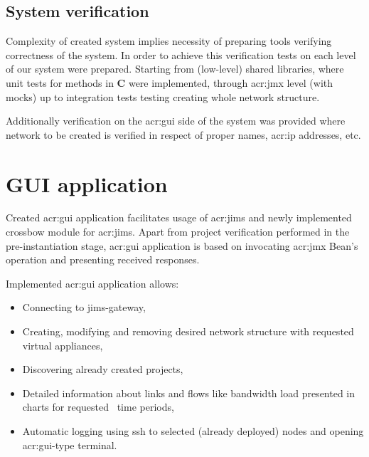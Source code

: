 \documentclass[11pt]{book}
\begin{document}
		\subsection{System verification}
			\label{sec:impl:verif}
		
      Complexity of created system implies necessity of preparing tools verifying correctness of the system. In order to
      achieve this verification tests on each level of our system were prepared. Starting from (low-level) shared
      libraries, where unit tests for methods in \textbf{C} were implemented, through \gls{acr:jmx} level (with mocks)
      up to integration tests testing creating whole network structure.
		
      Additionally verification on the \gls{acr:gui} side of the system was provided where network to be created is
      verified in respect of proper names, \gls{acr:ip} addresses, etc.

	\section{GUI application}
		\label{sec:impl:gui}
		
		Created \gls{acr:gui} application facilitates usage of \gls{acr:jims} and newly implemented crossbow module for \gls{acr:jims}. Apart from project verification 
                performed in the pre-instantiation stage, \gls{acr:gui} application is based on invocating \gls{acr:jmx} Bean's operation and presenting received responses.

		Implemented \gls{acr:gui} application allows:
		\begin{itemize}
			\item{Connecting to jims-gateway,}
			\item{Creating, modifying and removing desired network structure with requested virtual appliances,}
			\item{Discovering already created projects,}
			\item{Detailed information about links and flows like bandwidth load presented in charts for requested \
				time periods,}
			\item{Automatic logging using ssh to selected (already deployed) nodes and opening \gls{acr:gui}-type terminal.}
		\end{itemize}		
\end{document}
